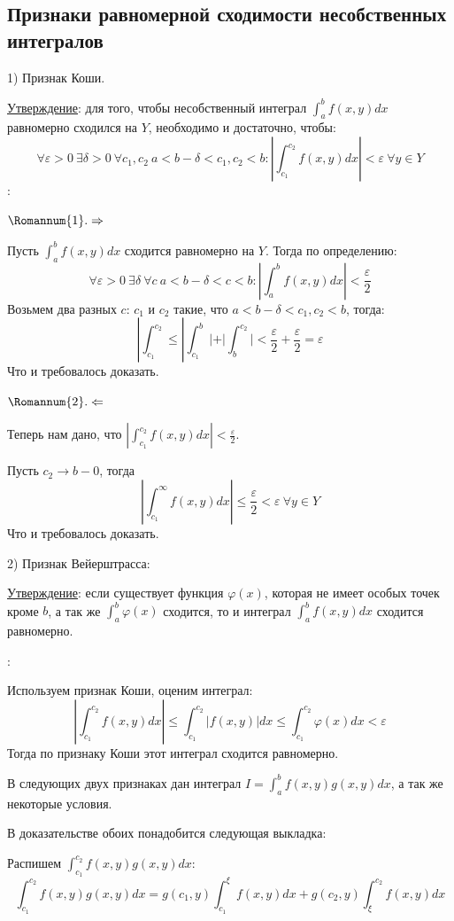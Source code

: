 \documentclass[12pt]{article}
\begin{document}
\subsection{Признаки равномерной сходимости несобственных интегралов}
1) Признак Коши.\par
\uline{Утверждение}: для того, чтобы несобственный интеграл $\int_a^b f(x,y) dx$ равномерно сходился на $Y$, необходимо и достаточно, чтобы:
$$\forall \varepsilon > 0 \ \exists \delta > 0 \ \forall c_1, c_2 \ a < b-\delta < c_1,c_2<b : |\int_{c_1}^{c_2} f(x,y) dx | < \varepsilon \ \forall y \in Y$$
:\par
$\Romannum{1}. \Rightarrow$\par
Пусть $\int_a^b f(x,y)dx$ сходится равномерно на $Y$. Тогда по определению:
$$\forall \varepsilon > 0 \ \exists \delta \ \forall c \ a < b -\delta < c < b : |\int_a^b f(x,y) dx| < \frac{\varepsilon}{2}$$
Возьмем два разных $c$: $c_1$ и $c_2$ такие, что $a < b-\delta < c_1,c_2 < b$, тогда:
$$|\int_{c_1}^{c_2} \leq |\int_{c_1}^b| + |\int_b^{c_2}| < \frac{\varepsilon}{2} + \frac{\varepsilon}{2} = \varepsilon$$
Что и требовалось доказать.\par
$\Romannum{2}. \Leftarrow$\par
Теперь нам дано, что $|\int_{c_1}^{c_2} f(x,y) dx| < \frac{\varepsilon}{2}$.\par
Пусть $c_2 \to b-0$, тогда
$$|\int_{c_1}^\infty f(x,y) dx | \leq \frac{\varepsilon}{2} < \varepsilon \ \forall y \in Y$$
Что и требовалось доказать.\par
2) Признак Вейерштрасса:\par
\uline{Утверждение}: если существует функция $\varphi(x)$, которая не имеет особых точек кроме $b$, а так же $\int_a^b \varphi(x)$ сходится, то и интеграл $\int_a^b f(x,y) dx$ сходится равномерно.\par
{}:\par
Используем признак Коши, оценим интеграл:
$$|\int_{c_1}^{c_2} f(x,y) dx| \leq \int_{c_1}^{c_2} |f(x,y)| dx \leq \int_{c_1}^{c_2} \varphi(x) dx < \varepsilon$$
Тогда по признаку Коши этот интеграл сходится равномерно.\par
В следующих двух признаках дан интеграл $I = \int_a^b f(x,y) g(x,y) dx$, а так же некоторые условия.\par
В доказательстве обоих понадобится следующая выкладка:\par
Распишем $\int_{c_1}^{c_2} f(x,y) g(x,y) dx$:
$$\int_{c_1}^{c_2} f(x,y) g(x,y) dx = g(c_1,y) \int_{c_1}^{\xi} f(x,y) dx + g(c_2,y) \int_{\xi}^{c_2} f(x,y)dx$$
\end{document}
